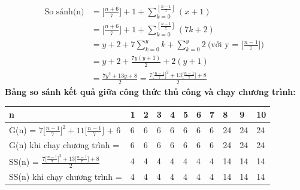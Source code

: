 \documentclass[10pt,a4paper]{article}
\begin{document}
    \begin{align*}
        \text{So sánh(n)}
        & = \big[\frac{n+6}{7}\big] + 1 + \sum_{k=0}^{[\frac{n-1}{7}]}{(x+1)} \\
        & = \big[\frac{n+6}{7}\big] + 1 + \sum_{k=0}^{[\frac{n-1}{7}]}{(7k+2)} \\
        & = y+2 + 7\sum_{k=0}^{y}{k} + \sum_{k=0}^{y}{2} \
        \text{(với y = $\big[\frac{n-1}{7}\big]$) } \\
        & = y + 2 + \frac{7y(y+1)}{2} + 2(y+1) \\
        & = \frac{7y^2 + 13y + 8}{2} = \frac{7\big[\frac{n-1}{7}\big]^2 + 13\big[\frac{n-1}{7}\big]+8}{2}
    \end{align*}
    \textbf{Bảng so sánh kết quả giữa công thức thủ công và chạy chương trình: }
    \fontsize{12}{14}\selectfont
    \renewcommand{\arraystretch}{2}
    \setlength{\arrayrulewidth}{1pt}
    \begin{table}[H]
        \centering
        \begin{tabular} [c]{|p{5cm}|p{0.75cm}|p{0.75cm}|p{0.75cm}|p{0.75cm}|p{0.75cm}|p{0.75cm}|p{0.75cm}|p{0.75cm}|p{0.75cm}|p{0.75cm}|}
        \hline
        \rowcolor[rgb]{0, .60, .800}
        n & 1 & 2 & 3 & 4 & 5 & 6 & 7 & 8 & 9 & 10 \\
        \hline
        G(n) = $7\big[\frac{n-1}{7}\big]^2 + 11\big[\frac{n-1}{7}\big]$ + 6 & 6 & 6 & 6 & 6 & 6 & 6 & 6 & 24 & 24 & 24  \\
        \hline
        \rowcolor[rgb]{0, .60, .800}
        G(n) khi chạy chương trình = & 6 & 6 & 6 & 6 & 6 & 6 & 6 & 24 & 24 & 24 \\
        \hline 
        SS(n) = $\frac{7\big[\frac{n-1}{7}\big]^2 + 13\big[\frac{n-1}{7}\big]+8}{2}$ & 4 & 4 & 4 & 4 & 4 & 4 & 4 & 14 & 14 & 14 \\
        \hline
        \rowcolor[rgb]{0, .60, .800}
        SS(n) khi chạy chương trình = & 4 & 4 & 4 & 4 & 4 & 4 & 4 & 14 & 14 & 14 \\
        \hline
    \end{tabular}
    \end{table}
\end{document}
